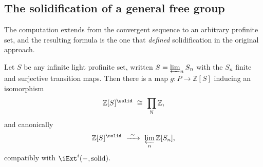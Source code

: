 \subsection{The solidification of a general free group}

The computation extends from the convergent sequence to an arbitrary profinite
set, and the resulting formula is the one that \emph{defined} solidification in
the original approach.

\begin{proposition}
\label{prop:5:general-S}
Let $S$ be any infinite light profinite set, written $S=\varprojlim_{n}S_{n}$
with the $S_{n}$ finite and surjective transition maps. Then there is a map
$g\colon P\to\mathbb{Z}[S]$ inducing an isomorphism
\begin{equation*}
\mathbb{Z}[S]^{\solid}\ \cong\ \prod_{\mathbb{N}}\mathbb{Z},
\end{equation*}
and canonically
\begin{equation}
\label{eq:5:ZS-limit}
\mathbb{Z}[S]^{\solid}\ \xrightarrow{\ \sim\ }\ \varprojlim_{n}\mathbb{Z}[S_{n}],
\end{equation}
compatibly with $\iExt^{i}(-,\text{solid})$.
\end{proposition}

